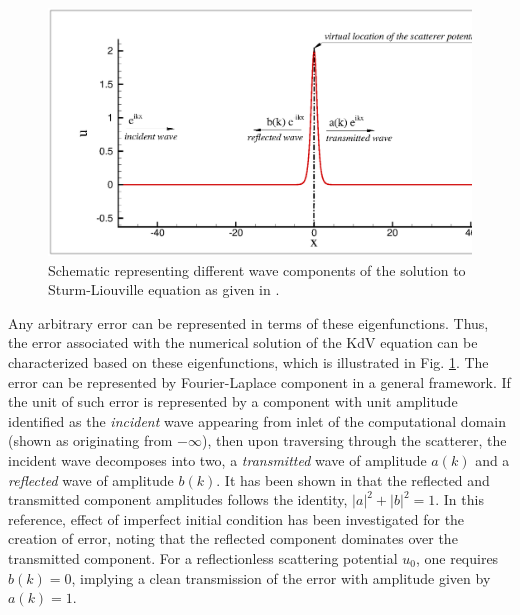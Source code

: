 \documentclass{svjour3}                    %
\begin{document}
\begin{figure}[h!]
\center
 \includegraphics[width=0.9\linewidth]{Fig_1}
  \caption{Schematic representing different wave components of the solution to Sturm-Liouville equation as given in \cite{Drazin1989}.}
  \label{fig:scatter}
\end{figure}

Any arbitrary error can be represented in terms of these eigenfunctions. Thus, the error associated with the numerical solution of the KdV equation 
can be characterized based on these eigenfunctions, which is illustrated in Fig. \ref{fig:scatter}. The error can be represented by Fourier-Laplace component in a general framework. If the unit of such error is represented by a component with unit amplitude identified as the \emph{incident} wave appearing from inlet of the computational domain (shown as originating from $-\infty$), then upon traversing through the scatterer, the incident wave decomposes into two, a \emph{transmitted} wave of amplitude $a(k)$ and a \emph{reflected} wave of amplitude $b(k)$. It has been shown in \cite{Drazin1989} that the reflected and transmitted component amplitudes follows the identity, $|a|^2 + |b|^2 =1$. In this reference, effect of imperfect initial condition has been investigated for the creation of error, noting that the reflected component dominates over the transmitted component. For a reflectionless scattering potential $u_0$, one requires $b(k)=0$, implying a clean transmission of the error with amplitude given by $a(k) = 1$.
\end{document}

